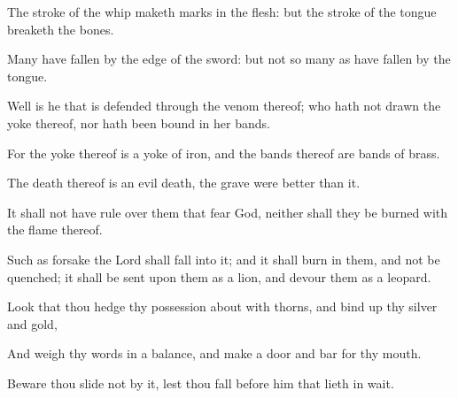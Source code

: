 {\par }{\PP {}The stroke of the whip maketh marks in the flesh: but the stroke of the tongue breaketh the bones.
\par }{\PP {}Many have fallen by the edge of the sword: but not so many as have fallen by the tongue.
\par }{\PP {}Well is he that is defended through the venom thereof; who hath not drawn the yoke thereof, nor hath been bound in her bands.
\par }{\PP {}For the yoke thereof is a yoke of iron, and the bands thereof are bands of brass.
\par }{\PP {}The death thereof is an evil death, the grave were better than it.
\par }{\PP {}It shall not have rule over them that fear God, neither shall they be burned with the flame thereof.
\par }{\PP {}Such as forsake the Lord shall fall into it; and it shall burn in them, and not be quenched; it shall be sent upon them as a lion, and devour them as a leopard.
\par }{\PP {}Look that thou hedge thy possession about with thorns, and bind up thy silver and gold,
\par }{\PP {}And weigh thy words in a balance, and make a door and bar for thy mouth.
\par }{\PP {}Beware thou slide not by it, lest thou fall before him that lieth in wait.

}
